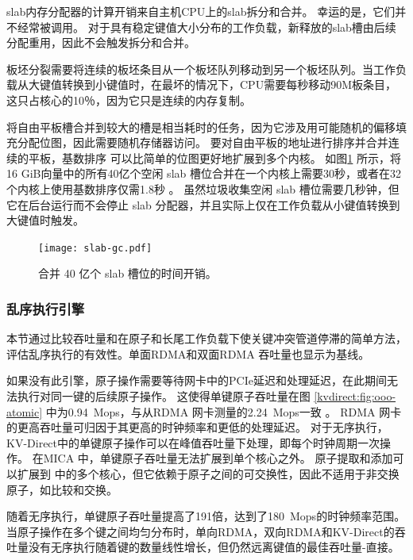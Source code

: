slab内存分配器的计算开销来自主机CPU上的slab拆分和合并。
幸运的是，它们并不经常被调用。
对于具有稳定键值大小分布的工作负载，新释放的slab槽由后续分配重用，因此不会触发拆分和合并。

板坯分裂需要将连续的板坯条目从一个板坯队列移动到另一个板坯队列。当工作负载从大键值转换到小键值时，在最坏的情况下，CPU需要每秒移动90M板条目，这只占核心的10％，因为它只是连续的内存复制。

将自由平板槽合并到较大的槽是相当耗时的任务，因为它涉及用可能随机的偏移填充分配位图，因此需要随机存储器访问。
要对自由平板的地址进行排序并合并连续的平板，基数排序 \cite {satish2010fast} 可以比简单的位图更好地扩展到多个内核。
如图\ref {kvdirect:fig:slab-garbage-collection} 所示，将16 GiB向量中的所有40亿个空闲 slab 槽位合并在一个内核上需要30秒，或者在32个内核上使用基数排序仅需1.8秒 \cite{satish2010fast}。
虽然垃圾收集空闲 slab 槽位需要几秒钟，但它在后台运行而不会停止 slab 分配器，并且实际上仅在工作负载从小键值转换到大键值时触发。


\begin{figure}[t]
	\centering
	\texttt{[image: slab-gc.pdf]}
	\caption{合并 40 亿个 slab 槽位的时间开销。}
	\label{kvdirect:fig:slab-garbage-collection}
\end{figure}




\subsubsection{乱序执行引擎}
\label{kvdirect:sec:ooo-eval}

本节通过比较吞吐量和在原子和长尾工作负载下使关键冲突管道停滞的简单方法，评估乱序执行的有效性。单面RDMA和双面RDMA \cite {kalia2016design}吞吐量也显示为基线。

如果没有此引擎，原子操作需要等待网卡中的PCIe延迟和处理延迟，在此期间无法执行对同一键的后续原子操作。
这使得单键原子吞吐量在图 \ref{kvdirect:fig:ooo-atomic} 中为0.94~Mops，与从RDMA 网卡测量的2.24~Mops一致 \cite {kalia2016design}。
RDMA 网卡的更高吞吐量可归因于其更高的时钟频率和更低的处理延迟。
对于无序执行，KV-Direct中的单键原子操作可以在峰值吞吐量下处理，即每个时钟周期一次操作。
在MICA \cite {lim2014mica} 中，单键原子吞吐量无法扩展到单个核心之外。
原子提取和添加可以扩展到 \cite {kalia2016design} 中的多个核心，但它依赖于原子之间的可交换性，因此不适用于非交换原子，如比较和交换。

随着无序执行，单键原子吞吐量提高了191倍，达到了180~Mops的时钟频率范围。
当原子操作在多个键之间均匀分布时，单向RDMA，双向RDMA和KV-Direct的吞吐量没有无序执行随着键的数量线性增长，但仍然远离键值的最佳吞吐量-直接。

